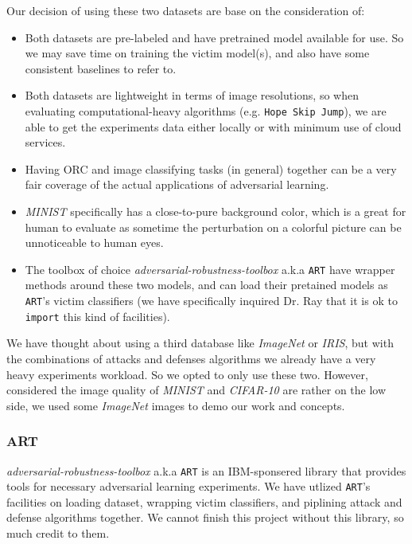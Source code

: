 \documentclass[11pt]{article}
\newcommand{\ilc}{\texttt}
\begin{document}
\noindent Our decision of using these two datasets are base on the consideration of:
\begin{itemize}
    \item Both datasets are pre-labeled and have pretrained model available for use. So we may save time on training the victim model(s), and also have some consistent baselines to refer to.
    \item Both datasets are lightweight in terms of image resolutions, so when evaluating computational-heavy algorithms (e.g. \ilc{Hope Skip Jump}), we are able to get the experiments data either locally or with minimum use of cloud services.
    \item Having ORC and image classifying tasks (in general) together can be a very fair coverage of the actual applications of adversarial learning.
    \item \textit{MINIST} specifically has a close-to-pure background color, which is a great for human to evaluate as sometime the perturbation on a colorful picture can be unnoticeable to human eyes.
    \item The toolbox of choice \textit{adversarial-robustness-toolbox} a.k.a \ilc{ART} have wrapper methods around these two models, and can load their pretained models as \ilc{ART}'s victim classifiers (we have specifically inquired Dr. Ray that it is ok to \ilc{import} this kind of facilities).
\end{itemize}

We have thought about using a third database like \textit{ImageNet} or \textit{IRIS}, but with the combinations of attacks and defenses algorithms we already have a very heavy experiments workload. So we opted to only use these two. However, considered the image quality of \textit{MINIST} and \textit{CIFAR-10} are rather on the low side, we used some \textit{ImageNet} images to demo our work and concepts.

\subsubsection{ART}

\textit{adversarial-robustness-toolbox}\cite{cite:art} a.k.a \ilc{ART} is an IBM-sponsered library that provides tools for necessary adversarial learning experiments. We have utlized \ilc{ART}'s facilities on loading dataset, wrapping victim classifiers, and piplining attack and defense algorithms together. We cannot finish this project without this library, so much credit to them.
\end{document}
